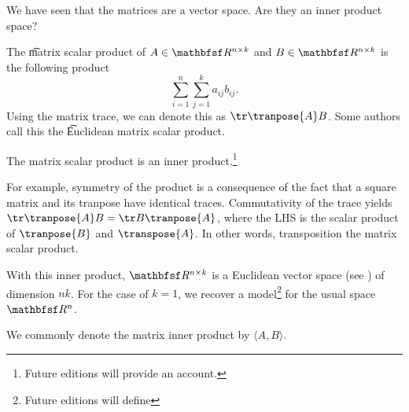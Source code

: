 

We have seen that the matrices are a vector space.
Are they an inner product space?


The \t{matrix scalar product} of $A \in \R^{n \times k}$ and $B \in \R^{n \times k}$ is the following product
\[
  \sum_{i = 1}^{n} \sum_{j = 1}^{k} a_{ij}b_{ij}.
\]
Using the matrix trace, we can denote this as $\tr \tranpose{A} B$.
Some authors call this the \t{Euclidean matrix scalar product}.

\begin{proposition}
The matrix scalar product is an inner product.\footnote{Future editions will provide an account.}
\end{proposition}

For example, symmetry of the product is a consequence of the fact that a square matrix and its tranpose have identical traces.
Commutativity of the trace yields $\tr \tranpose{A} B = \tr B\tranpose{A}$, where the LHS is the scalar product of $\tranpose{B}$ and $\transpose{A}$.
In other words, transposition  the matrix scalar product.

With this inner product, $\R^{n \times k}$ is a Euclidean vector space (see ) of dimension $nk$.
For the case of $k = 1$, we recover a model\footnote{Future editions will define} for the usual space $\R^n$.


We commonly denote the matrix inner product by $\langle A, B \rangle$.


\blankpage
